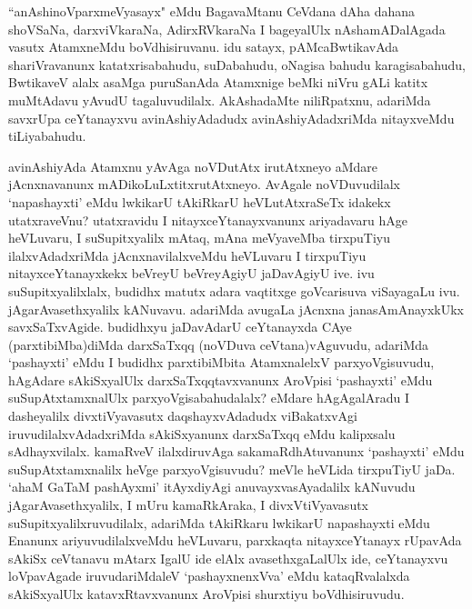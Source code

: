 \begin{artha}
``anAshinoV\s parxmeVyasayx" eMdu BagavaMtanu CeVdana dAha dahana shoVSaNa, darxviVkaraNa, AdirxRVkaraNa I bageyalUlx nAshamADalAgada vasutx AtamxneMdu boVdhisiruvanu. idu satayx, pAMcaBwtikavAda shariVravanunx katatxrisabahudu, suDabahudu, oNagisa bahudu karagisabahudu, BwtikaveV alalx asaMga puruSanAda Atamxnige beMki niVru gALi katitx muMtAdavu yAvudU tagaluvudilalx. AkAshadaMte niliRpatxnu, adariMda savxrUpa ceYtanayxvu avinAshiyAdadudx avinAshiyAdadxriMda nitayxveMdu tiLiyabahudu. 
\end{artha}


\begin{artha}
avinAshiyAda Atamxnu yAvAga noVDutAtx irutAtxneyo aMdare jAcnxnavanunx mADikoLuLxtitxrutAtxneyo. AvAgale noVDuvudilalx `napashayxti' eMdu lwkikarU tAkiRkarU heVLutAtxraSeTx idakekx utatxraveVnu? utatxravidu I nitayxceYtanayxvanunx ariyadavaru hAge heVLuvaru, I suSupitxyalilx mAtaq, mAna meVyaveMba tirxpuTiyu ilalxvAdadxriMda jAcnxnavilalxveMdu heVLuvaru I tirxpuTiyu nitayxceYtanayxkekx beVreyU beVreyAgiyU jaDavAgiyU ive. ivu suSupitxyalilxlalx, budidhx matutx adara vaqtitxge goVcarisuva viSayagaLu ivu. jAgarAvasethxyalilx kANuvavu. adariMda avugaLa jAcnxna janasAmAnayxkUkx savxSaTxvAgide. budidhxyu jaDavAdarU ceYtanayxda CAye (parxtibiMba)diMda darxSaTxqq (noVDuva ceVtana)vAguvudu, adariMda `pashayxti' eMdu I budidhx parxtibiMbita AtamxnalelxV parxyoVgisuvudu, hAgAdare sAkiSxyalUlx darxSaTxqqtavxvanunx AroVpisi `pashayxti' eMdu suSupAtxtamxnalUlx parxyoVgisabahudalalx? eMdare hAgAgalAradu I dasheyalilx divxtiVyavasutx daqshayxvAdadudx viBakatxvAgi iruvudilalxvAdadxriMda sAkiSxyanunx darxSaTxqq eMdu kalipxsalu sAdhayxvilalx. kamaRveV ilalxdiruvAga sakamaRdhAtuvanunx `pashayxti' eMdu suSupAtxtamxnalilx heVge parxyoVgisuvudu? meVle heVLida tirxpuTiyU jaDa. `ahaM GaTaM pashAyxmi' itAyxdiyAgi anuvayxvasAyadalilx kANuvudu jAgarAvasethxyalilx, I mUru kamaRkAraka, I divxVtiVyavasutx suSupitxyalilxruvudilalx, adariMda tAkiRkaru lwkikarU napashayxti eMdu Enanunx ariyuvudilalxveMdu heVLuvaru, parxkaqta nitayxceYtanayx rUpavAda sAkiSx ceVtanavu mAtarx IgalU ide elAlx avasethxgaLalUlx ide, ceYtanayxvu loVpavAgade iruvudariMdaleV `pashayxnenxVva' eMdu kataqRvalalxda sAkiSxyalUlx katavxRtavxvanunx AroVpisi shurxtiyu boVdhisiruvudu. 
\end{artha}%


